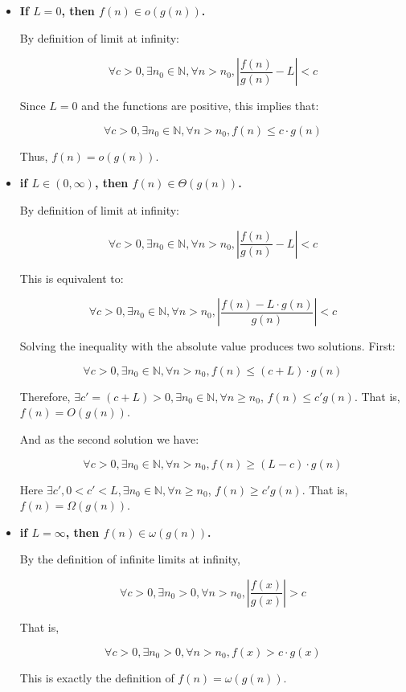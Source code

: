 \documentclass[a4paper]{article}
\begin{document}
\begin{itemize}
\item \textbf{If $L = 0$, then $f(n) \in o(g(n))$.}

By definition of limit at infinity:

$$\forall c > 0, \exists n_0 \in \mathbb{N}, \forall n > n_0, \left | \frac{f(n)}{g(n)} - L \right | < c$$

Since $L=0$ and the functions are positive, this implies that:

$$\forall c > 0, \exists n_0 \in \mathbb{N}, \forall n > n_0, f(n) \le c \cdot g(n)$$

Thus, $f(n) = o(g(n))$.

\bigskip

\item \textbf{if $L \in (0, \infty)$, then $f(n) \in \Theta(g(n))$.}

By definition of limit at infinity:

$$\forall c > 0, \exists n_0 \in \mathbb{N}, \forall n > n_0, \left | \frac{f(n)}{g(n)} - L \right | < c$$

This is equivalent to:

$$\forall c > 0, \exists n_0 \in \mathbb{N}, \forall n > n_0,  \left | \frac{f(n) - L \cdot g(n)}{g(n)} \right | < c$$

Solving the inequality with the absolute value produces two solutions. First:

$$\forall c > 0, \exists n_0 \in \mathbb{N}, \forall n > n_0,  f(n) \le (c + L) \cdot g(n)$$


Therefore, $\exists c' = (c + L) > 0, \exists n_0 \in \mathbb{N}, \forall n \ge n_0$, $f(n) \le c' g(n)$.
That is, $f(n) = O(g(n))$.

\bigskip And as the second solution we have:

$$\forall c > 0, \exists n_0 \in \mathbb{N}, \forall n > n_0,  f(n) \ge (L - c) \cdot g(n)$$

Here $\exists c', 0 < c' < L, \exists n_0 \in \mathbb{N}, \forall n \ge n_0$, $f(n) \ge c' g(n)$. That is, $f(n) = \Omega(g(n))$.

\item \textbf{if $L = \infty$, then $f(n) \in \omega(g(n))$.}

By the definition of infinite limits at infinity,

$$\forall c > 0, \exists n_0>0, \forall n > n_0, \left | \frac{f(x)}{g(x)} \right | > c$$

That is,

$$\forall c > 0, \exists n_0>0, \forall n > n_0, f(x) > c \cdot g(x)$$

This is exactly the definition of $f(n) = \omega(g(n))$.


\end{itemize}
\end{document}
